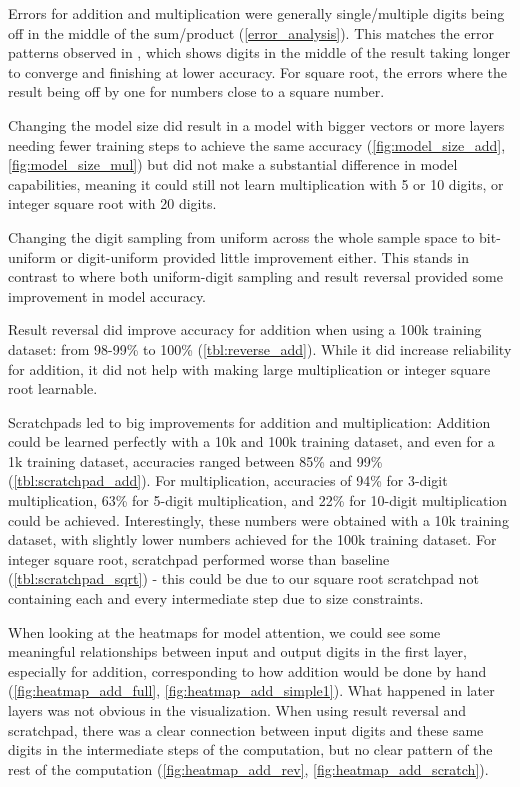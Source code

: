 Errors for addition and multiplication were generally single/multiple digits being off in the middle of the sum/product (\cref{error_analysis}). This matches the error patterns observed in , which shows digits in the middle of the result taking longer to converge and finishing at lower accuracy.
For square root, the errors where the result being off by one for numbers close to a square number.

Changing the model size did result in a model with bigger vectors or more layers needing fewer training steps to achieve the same accuracy (\cref{fig:model_size_add}, \cref{fig:model_size_mul}) but did not make a substantial difference in model capabilities, meaning it could still not learn multiplication with 5 or 10 digits, or integer square root with 20 digits.

Changing the digit sampling from uniform across the whole sample space to bit-uniform or digit-uniform provided little improvement either. This stands in contrast to \cite{positionmatters} where both uniform-digit sampling and result reversal provided some improvement in model accuracy.

Result reversal did improve accuracy for addition when using a 100k training dataset: from 98-99\% to 100\% (\cref{tbl:reverse_add}). While it did increase reliability for addition, it did not help with making large multiplication or integer square root learnable.

Scratchpads led to big improvements for addition and multiplication: Addition could be learned perfectly with a 10k and 100k training dataset, and even for a 1k training dataset, accuracies ranged between 85\% and 99\% (\cref{tbl:scratchpad_add}). For multiplication, accuracies of 94\% for 3-digit multiplication, 63\% for 5-digit multiplication, and 22\% for 10-digit multiplication could be achieved. Interestingly, these numbers were obtained with a 10k training dataset, with slightly lower numbers achieved for the 100k training dataset. For integer square root, scratchpad performed worse than baseline (\cref{tbl:scratchpad_sqrt}) - this could be due to our square root scratchpad not containing each and every intermediate step due to size constraints.

When looking at the heatmaps for model attention, we could see some meaningful relationships between input and output digits in the first layer, especially for addition, corresponding to how addition would be done by hand (\cref{fig:heatmap_add_full}, \cref{fig:heatmap_add_simple1}). What happened in later layers was not obvious in the visualization. When using result reversal and scratchpad, there was a clear connection between input digits and these same digits in the intermediate steps of the computation, but no clear pattern of the rest of the computation (\cref{fig:heatmap_add_rev}, \cref{fig:heatmap_add_scratch}).

